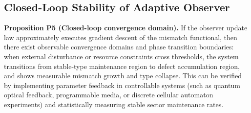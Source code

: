 \subsection{Closed-Loop Stability of Adaptive Observer}

\textbf{Proposition P5 (Closed-loop convergence domain).} If the observer update law approximately executes gradient descent of the mismatch functional, then there exist observable convergence domains and phase transition boundaries: when external disturbance or resource constraints cross thresholds, the system transitions from stable-type maintenance region to defect accumulation region, and shows measurable mismatch growth and type collapse. This can be verified by implementing parameter feedback in controllable systems (such as quantum optical feedback, programmable media, or discrete cellular automaton experiments) and statistically measuring stable sector maintenance rates.
